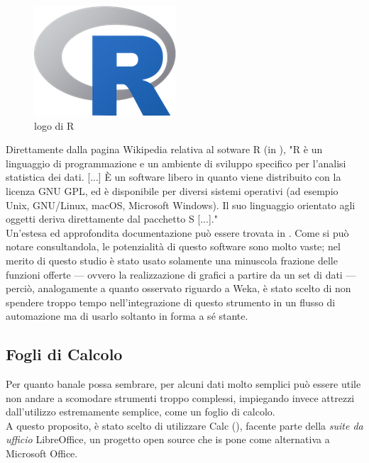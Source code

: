         \begin{figure}
            \centering
            \caption{logo di R}
            \label{R}
    	    \includegraphics[scale=0.75]{img/R.png}
        \end{figure}

        Direttamente dalla pagina Wikipedia relativa al sotware R (in \cite{Rwiki}), "R è un linguaggio di programmazione e un ambiente di sviluppo specifico per l'analisi statistica dei dati. [...] È un software libero in quanto viene distribuito con la licenza GNU GPL, ed è disponibile per diversi sistemi operativi (ad esempio Unix, GNU/Linux, macOS, Microsoft Windows). Il suo linguaggio orientato agli oggetti deriva direttamente dal pacchetto S [...]." \\

        Un'estesa ed approfondita documentazione può essere trovata in \cite{R}. Come si può notare consultandola, le potenzialità di questo software sono molto vaste; nel merito di questo studio è stato usato solamente una minuscola frazione delle funzioni offerte --- ovvero la realizzazione di grafici a partire da un set di dati --- perciò, analogamente a quanto osservato riguardo a Weka, è stato scelto di non spendere troppo tempo nell'integrazione di questo strumento in un flusso di automazione ma di usarlo soltanto in forma a sé stante.\\

    \subsection{Fogli di Calcolo}

    Per quanto banale possa sembrare, per alcuni dati molto semplici può essere utile non andare a scomodare strumenti troppo complessi, impiegando invece attrezzi dall'utilizzo estremamente semplice, come un foglio di calcolo. \\

    A questo proposito, è stato scelto di utilizzare Calc (\cite{calc}), facente parte della \textit{suite da ufficio} LibreOffice, un progetto open source che is pone come alternativa a Microsoft Office. \\

